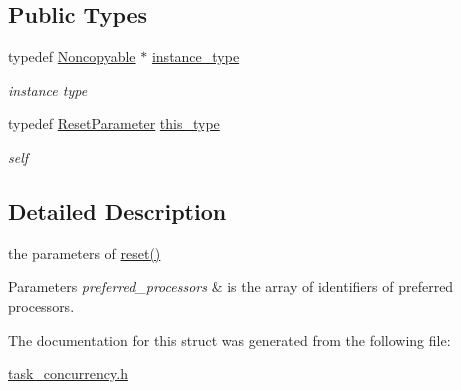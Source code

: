 \subsection*{Public Types}
\begin{DoxyCompactItemize}
\item 
\hypertarget{classhryky_1_1_noncopyable_aaf87abb55f700af85ecb0895f6178821}{typedef \hyperlink{classhryky_1_1_noncopyable}{Noncopyable} $\ast$ \hyperlink{classhryky_1_1_noncopyable_aaf87abb55f700af85ecb0895f6178821}{instance\-\_\-type}}\label{classhryky_1_1_noncopyable_aaf87abb55f700af85ecb0895f6178821}

\begin{DoxyCompactList}\small\item\em instance type \end{DoxyCompactList}\item 
\hypertarget{structhryky_1_1task_1_1_concurrency_1_1_reset_parameter_ad921290d16731ca4a73dc33b38295713}{typedef \hyperlink{structhryky_1_1task_1_1_concurrency_1_1_reset_parameter}{Reset\-Parameter} \hyperlink{structhryky_1_1task_1_1_concurrency_1_1_reset_parameter_ad921290d16731ca4a73dc33b38295713}{this\-\_\-type}}\label{structhryky_1_1task_1_1_concurrency_1_1_reset_parameter_ad921290d16731ca4a73dc33b38295713}

\begin{DoxyCompactList}\small\item\em self \end{DoxyCompactList}\end{DoxyCompactItemize}


\subsection{Detailed Description}
the parameters of \hyperlink{classhryky_1_1task_1_1_concurrency_aa81eeaa909ee4abde16a1619da5c011d}{reset()} 


\begin{DoxyParams}{Parameters}
{\em preferred\-\_\-processors} & is the array of identifiers of preferred processors. \\
\hline
\end{DoxyParams}


The documentation for this struct was generated from the following file\-:\begin{DoxyCompactItemize}
\item 
\hyperlink{task__concurrency_8h}{task\-\_\-concurrency.\-h}\end{DoxyCompactItemize}
